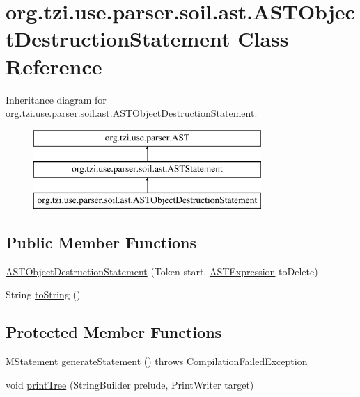 \hypertarget{classorg_1_1tzi_1_1use_1_1parser_1_1soil_1_1ast_1_1_a_s_t_object_destruction_statement}{\section{org.\-tzi.\-use.\-parser.\-soil.\-ast.\-A\-S\-T\-Object\-Destruction\-Statement Class Reference}
\label{classorg_1_1tzi_1_1use_1_1parser_1_1soil_1_1ast_1_1_a_s_t_object_destruction_statement}
}
Inheritance diagram for org.\-tzi.\-use.\-parser.\-soil.\-ast.\-A\-S\-T\-Object\-Destruction\-Statement\-:\begin{figure}[H]
\begin{center}
\leavevmode
\includegraphics[height=3.000000cm]{classorg_1_1tzi_1_1use_1_1parser_1_1soil_1_1ast_1_1_a_s_t_object_destruction_statement}
\end{center}
\end{figure}
\subsection*{Public Member Functions}
\begin{DoxyCompactItemize}
\item 
\hyperlink{classorg_1_1tzi_1_1use_1_1parser_1_1soil_1_1ast_1_1_a_s_t_object_destruction_statement_a609f81c65a26999e30e85171b9f4352f}{A\-S\-T\-Object\-Destruction\-Statement} (Token start, \hyperlink{classorg_1_1tzi_1_1use_1_1parser_1_1ocl_1_1_a_s_t_expression}{A\-S\-T\-Expression} to\-Delete)
\item 
String \hyperlink{classorg_1_1tzi_1_1use_1_1parser_1_1soil_1_1ast_1_1_a_s_t_object_destruction_statement_af60035bebefebb2b0b8d9f50e3c0d530}{to\-String} ()
\end{DoxyCompactItemize}
\subsection*{Protected Member Functions}
\begin{DoxyCompactItemize}
\item 
\hyperlink{classorg_1_1tzi_1_1use_1_1uml_1_1sys_1_1soil_1_1_m_statement}{M\-Statement} \hyperlink{classorg_1_1tzi_1_1use_1_1parser_1_1soil_1_1ast_1_1_a_s_t_object_destruction_statement_aaffa27322dd819dee6b33dac04541d97}{generate\-Statement} ()  throws Compilation\-Failed\-Exception 
\item 
void \hyperlink{classorg_1_1tzi_1_1use_1_1parser_1_1soil_1_1ast_1_1_a_s_t_object_destruction_statement_abb7de8e12fdb72c90fa9546c7b3da963}{print\-Tree} (String\-Builder prelude, Print\-Writer target)
\end{DoxyCompactItemize}

